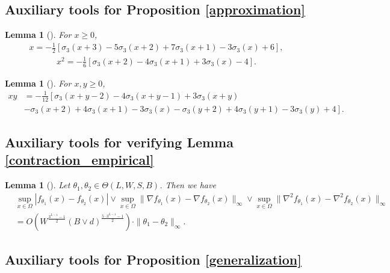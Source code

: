 \documentclass{article}
\theoremstyle{plain}
\newtheorem{lemma}[theorem]{Lemma}
\theoremstyle{definition}
\theoremstyle{remark}
\begin{document}
\subsection{Auxiliary tools for Proposition \ref{approximation}}

\begin{lemma}[{\citep[Theorem 4.5]{lu2021machine}}] \label{power_relu3}
For $x \geq 0$,
\begin{align*}
    x = -\frac{1}{2}[\sigma_3(x+3) -5 \sigma_3(x+2) + 7 \sigma_3(x+1) - 3\sigma_3(x) + 6],
\end{align*}
\begin{align*}
    x^2 = -\frac{1}{6} [\sigma_3(x+2) - 4 \sigma_3(x+1) + 3\sigma_3(x)-4]. 
\end{align*}
\end{lemma}

\begin{lemma}[{\citep[Theorem 4.5]{lu2021machine}}] \label{multiplication_relu3}
    For $x, y \geq 0$, 
    \begin{align*}
        xy & = -\frac{1}{12}\left[\sigma_3(x+y-2)- 4\sigma_3(x+y-1) + 3\sigma_3(x+y) \right. \\
        & \left. -\sigma_3(x+2) + 4 \sigma_3(x+1) - 3 \sigma_3(x)-\sigma_3(y+2) + 4 \sigma_3(y+1) - 3 \sigma_3(y) + 4 \right].
    \end{align*}
\end{lemma}

\subsection{Auxiliary tools for verifying Lemma \ref{contraction_empirical}}

\begin{lemma}[{\cite{lu2021machine}}] \label{lipschitzness}
     Let $\theta_1, \theta_2 \in \Theta(L, W, S, B)$. Then we have
     \begin{align*}
         & \sup_{x \in \Omega} |f_{\theta_1}(x) -  f_{\theta_2}(x)| \vee  \sup_{x \in \Omega} \|\nabla f_{\theta_1}(x) - \nabla f_{\theta_2}(x)\|_\infty \vee \sup_{x \in \Omega} \|\nabla^2 f_{\theta_1}(x) - \nabla^2 f_{\theta_2}(x)\|_\infty \\ & = O(W^{\frac{3^{L-1}-1}{2}} (B \vee d)^{\frac{5 \cdot 3^{L-1}-1}{2}}) \cdot \|\theta_1 - \theta_2\|_\infty. 
     \end{align*}
\end{lemma}

\subsection{Auxiliary tools for Proposition \ref{generalization}}
\end{document}
